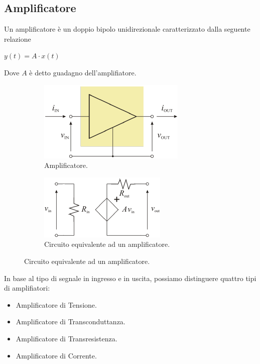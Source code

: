 \documentclass[a4paper]{article}
\begin{document}
		\subsection{Amplificatore}
			Un amplificatore è un doppio bipolo unidirezionale caratterizzato dalla seguente relazione
			\begin{center}
				$ y(t) = A \cdot x(t) $
			\end{center}
			\newline
			Dove $ A $ è detto guadagno dell'amplifiatore.
			\begin{figure}[h!]
				\centering
				\begin{subfigure}{0.4\textwidth}
					\centering
					\includegraphics[scale=0.7]{amplificatore}
					\caption{Amplificatore.}
				\end{subfigure}
				\begin{subfigure}{0.4\textwidth}
					\centering
					\includegraphics[scale=0.7]{amplificatoreCircuito}
					\caption{Circuito equivalente ad un amplificatore.}
				\end{subfigure}
				\label{fig:amplificatore}
			\end{figure}
			\newline
			In base al tipo di segnale in ingresso e in uscita, possiamo distinguere quattro tipi di amplifiatori:
			\begin{itemize}
				\item Amplificatore di Tensione.
				\item Amplificatore di Transconduttanza.
				\item Amplificatore di Transresistenza.
				\item Amplificatore di Corrente.
			\end{itemize}
\end{document}
